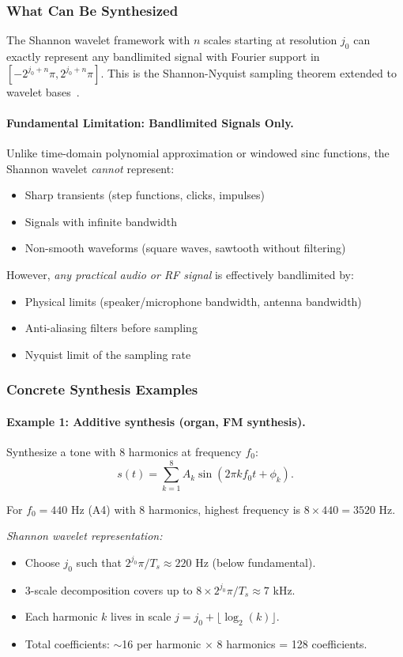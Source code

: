 \subsubsection{What Can Be Synthesized}

The Shannon wavelet framework with $n$ scales starting at resolution $j_0$ can exactly represent any bandlimited signal with Fourier support in $[-2^{j_0+n}\pi, 2^{j_0+n}\pi]$. This is the Shannon-Nyquist sampling theorem extended to wavelet bases~\cite{Daubechies1992}.

\paragraph{Fundamental Limitation: Bandlimited Signals Only.}
Unlike time-domain polynomial approximation or windowed sinc functions, the Shannon wavelet \emph{cannot} represent:
\begin{itemize}
\item Sharp transients (step functions, clicks, impulses)
\item Signals with infinite bandwidth
\item Non-smooth waveforms (square waves, sawtooth without filtering)
\end{itemize}

However, \emph{any practical audio or RF signal} is effectively bandlimited by:
\begin{itemize}
\item Physical limits (speaker/microphone bandwidth, antenna bandwidth)
\item Anti-aliasing filters before sampling
\item Nyquist limit of the sampling rate
\end{itemize}

\subsubsection{Concrete Synthesis Examples}

\paragraph{Example 1: Additive synthesis (organ, FM synthesis).}
Synthesize a tone with 8 harmonics at frequency $f_0$:
\[
s(t) = \sum_{k=1}^{8} A_k \sin(2\pi k f_0 t + \phi_k).
\]

For $f_0 = 440$ Hz (A4) with 8 harmonics, highest frequency is $8 \times 440 = 3520$ Hz.

\emph{Shannon wavelet representation:}
\begin{itemize}
\item Choose $j_0$ such that $2^{j_0}\pi / T_s \approx 220$ Hz (below fundamental).
\item 3-scale decomposition covers up to $8 \times 2^{j_0}\pi / T_s \approx 7$ kHz.
\item Each harmonic $k$ lives in scale $j = j_0 + \lfloor \log_2(k) \rfloor$.
\item Total coefficients: $\sim$16 per harmonic $\times$ 8 harmonics = 128 coefficients.
\end{itemize}

